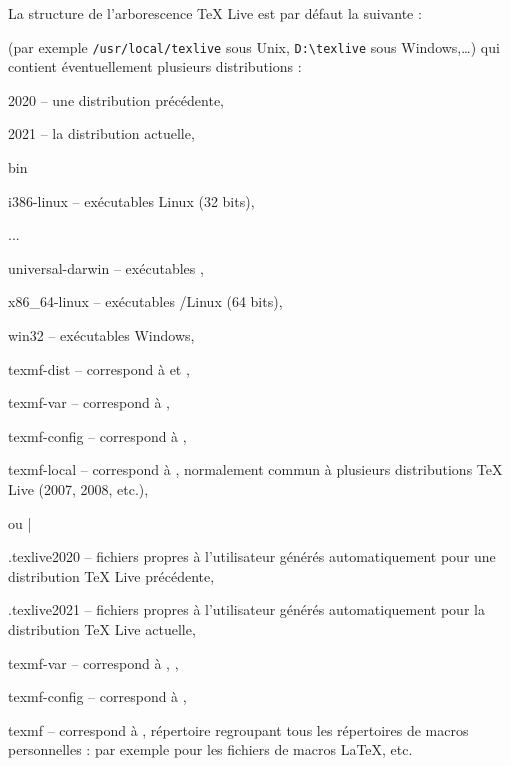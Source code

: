 \documentclass[german, english, french]{article}
\renewcommand{\TL}{\TeX{} Live\xspace}%
\begin{document}
La structure de l'arborescence \TL{} est par défaut la suivante :
\begin{description}
\item[racine multi-utilisateur] (par exemple \verb|/usr/local/texlive| sous
  Unix, \verb|D:\texlive| sous Windows,\dots) qui contient éventuellement
  plusieurs distributions :
  \begin{ttdescription}
  \item[2020] -- une distribution précédente,
  \item[2021] -- la distribution actuelle,
    \begin{ttdescription}
    \item[bin] ~
      \begin{ttdescription}
      \item[i386-linux] -- exécutables Linux (32 bits),
      \item[...]
      \item [universal-darwin] -- exécutables \MacOSX,
      \item [x86\_64-linux] -- exécutables \GNU/Linux (64 bits),
      \item[win32] -- exécutables Windows,
      \end{ttdescription}
    \item[texmf-dist] -- correspond à  et
      ,
    \item[texmf-var] -- correspond à ,
    \item[texmf-config] -- correspond à ,
    \end{ttdescription}
  \item[texmf-local] -- correspond à , normalement commun
    à plusieurs distributions \TL{} (2007, 2008, etc.),
  \end{ttdescription}
\item[répertoire personnel de l'utilisateur]  %
  ou |%
  \begin{ttdescription}
  \item[.texlive2020] -- fichiers propres à l'utilisateur générés
    automatiquement pour une distribution \TL{} précédente,
  \item[.texlive2021] -- fichiers propres à l'utilisateur générés
    automatiquement pour la distribution \TL{} actuelle,
    \begin{ttdescription}
    \item[texmf-var] -- correspond à , ,
    \item[texmf-config] -- correspond à ,
    \end{ttdescription}
  \item[texmf] -- correspond à , répertoire regroupant tous
    les répertoires de macros personnelles :  par
    exemple pour les fichiers de macros \LaTeX, etc.
  \end{ttdescription}
\end{description}
\end{document}
